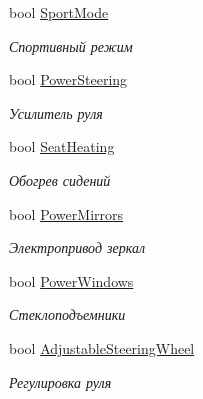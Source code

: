 \begin{DoxyCompactItemize}
bool \hyperlink{class_r_t_1_1_parsing_libs_1_1_models_1_1_automoto_additional_info_a249a2a5e5f501ceb3a832a104313f15c}{Sport\+Mode}
\begin{DoxyCompactList}\small\item\em Спортивный режим \end{DoxyCompactList}\item 
bool \hyperlink{class_r_t_1_1_parsing_libs_1_1_models_1_1_automoto_additional_info_a11c6475b71554f852946cf39db0afdb1}{Power\+Steering}
\begin{DoxyCompactList}\small\item\em Усилитель руля \end{DoxyCompactList}\item 
bool \hyperlink{class_r_t_1_1_parsing_libs_1_1_models_1_1_automoto_additional_info_ad7a1e47a20a8c3583133d231fc3bda17}{Seat\+Heating}
\begin{DoxyCompactList}\small\item\em Обогрев сидений \end{DoxyCompactList}\item 
bool \hyperlink{class_r_t_1_1_parsing_libs_1_1_models_1_1_automoto_additional_info_aff3b890b6daeb1158a4b56ad28fc150e}{Power\+Mirrors}
\begin{DoxyCompactList}\small\item\em Электропривод зеркал \end{DoxyCompactList}\item 
bool \hyperlink{class_r_t_1_1_parsing_libs_1_1_models_1_1_automoto_additional_info_ac575540ebc5eab414cac5ee2db569a08}{Power\+Windows}
\begin{DoxyCompactList}\small\item\em Стеклоподъемники \end{DoxyCompactList}\item 
bool \hyperlink{class_r_t_1_1_parsing_libs_1_1_models_1_1_automoto_additional_info_a1a800cd34a920dc86e548a500c35e947}{Adjustable\+Steering\+Wheel}
\begin{DoxyCompactList}\small\item\em Регулировка руля \end{DoxyCompactList}\item 

\end{DoxyCompactItemize}
